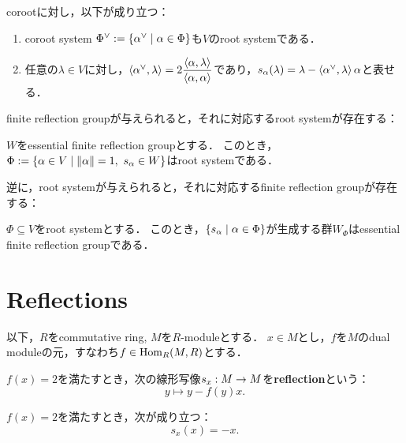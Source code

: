 \begin{proposition}
  corootに対し，以下が成り立つ：
  \begin{enumerate}[label=(\arabic*)]
    \item coroot system $\Phi^\vee := \left\lbrace \alpha^\vee \mathrel{} \middle| \mathrel{} \alpha \in \Phi \right\rbrace$も$V$のroot systemである．
    \item 任意の$\lambda \in V$に対し，$\left\langle \alpha^\vee, \lambda \right\rangle = 2 \dfrac{\left\langle \alpha, \lambda \right\rangle}{\left\langle \alpha, \alpha \right\rangle}$であり，$s_\alpha(\lambda) = \lambda - \left\langle \alpha^\vee, \lambda \right\rangle\alpha$と表せる．
  \end{enumerate}
\end{proposition}

finite reflection groupが与えられると，それに対応するroot systemが存在する：
\begin{proposition}
  $W$をessential finite reflection groupとする．
  このとき，$\Phi := \set{\alpha \in V}{\norm{\alpha} = 1,\ s_\alpha \in W}$はroot systemである．
\end{proposition}

逆に，root systemが与えられると，それに対応するfinite reflection groupが存在する：
\begin{proposition}
  $\Phi \subseteq V$をroot systemとする．
  このとき，$\left\lbrace s_\alpha \mathrel{} \middle| \mathrel{} \alpha \in \Phi \right\rbrace$が生成する群$W_\Phi$はessential finite reflection groupである．
\end{proposition}

\section{Reflections}
以下，$R$をcommutative ring, $M$を$R$-moduleとする．
$x \in M$とし，$f$を$M$のdual moduleの元，すなわち$f \in \operatorname{Hom}_R(M, R)$とする．

\begin{definition}
  \label{defi:Module.reflection}
  \leanok
  $f(x) = 2$を満たすとき，次の線形写像$s_x : M \rightarrow M$を\textbf{reflection}という：
  \begin{equation}
    y \mapsto y - f(y) x.
  \end{equation}
\end{definition}

\begin{lemma}
  \label{lem:Module.reflection_apply_self}
  \leanok
  $f(x) = 2$を満たすとき，次が成り立つ：
  \begin{equation}
    s_x(x) = -x.
  \end{equation}
\end{lemma}

